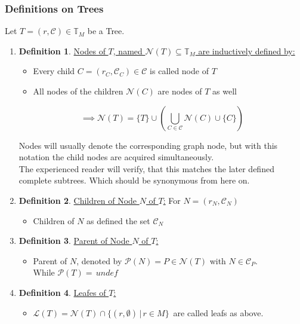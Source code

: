 \documentclass[a4paper,12pt]{article}
\theoremstyle{definition}
\newtheorem{definition}{Definition}[section]
\begin{document}
		\subsubsection{Definitions on Trees}
		Let $T=(r,\mathcal{C})\in \mathds{T}_M$ be a Tree.
		\begin{enumerate}[$ $]
			\item \begin{definition}
				\underline{Nodes of $T$, named $\mathcal{N}(T)\subseteq \mathds{T}_M$ are inductively defined by:}
				\begin{itemize}
					\item Every child $C=(r_C,\mathcal{C}_C)\in \mathcal{C}$ is called node of $T$
					\item  All nodes of the children $\mathcal{N}(C)$ are nodes of $T$ as well
				\end{itemize}
				\[\implies \mathcal{N}(T)=\{T\}\cup\left (\bigcup_{C\in\mathcal{C}} \mathcal{N}(C) \cup \{C\}\right)\]
				
				Nodes will usually denote the corresponding graph node, but with this notation the child nodes are acquired simultaneously. \\The experienced reader will verify, that this matches the later defined complete subtrees. Which should be synonymous from here on.
			\end{definition}
			\item \begin{definition}
				\underline{Children of Node $N$ of $T$:}
				For $N=(r_N, \mathcal{C}_N)$
				\begin{itemize}
					\item Children of $N$ as defined the set $\mathcal{C}_N$
				\end{itemize}
			\end{definition}
			\item \begin{definition}
				\underline{Parent of Node $N$ of $T$:}
				\begin{itemize}
					\item Parent of $N$, denoted by $\mathcal{P}(N)=P\in \mathcal{N}(T)$ with $N\in \mathcal{C}_P$.\\
					While $\mathcal{P}(T)=\,undef$
				\end{itemize}
			\end{definition}
			\item \begin{definition}
				\underline{Leafes of $T$:}
				\begin{itemize}
					\item $\mathcal{L}(T)= \mathcal{N}(T) \cap \{(r,\emptyset)\,\vert\, r\in M\}\,$ are called leafs as above.
				\end{itemize}
			\end{definition}
		\end{enumerate}
\end{document}
